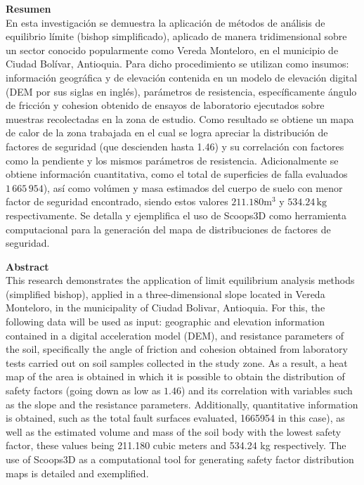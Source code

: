 \newpage
\textbf{\LARGE Resumen}\\
En esta investigaci\'on se demuestra la aplicaci\'on de m\'etodos de an\'alisis de equilibrio l\'imite (bishop simplificado), aplicado de manera tridimensional sobre un sector conocido popularmente como Vereda Monteloro, en el municipio de Ciudad Bol\'ivar, Antioquia. Para dicho procedimiento se utilizan como insumos: informaci\'on geogr\'afica y de elevaci\'on contenida en un modelo de elevaci\'on digital (DEM por sus siglas en ingl\'es), par\'ametros de resistencia, espec\'ificamente \'angulo de fricci\'on y cohesion obtenido de ensayos de laboratorio ejecutados sobre muestras recolectadas en la zona de estudio. Como resultado se obtiene un mapa de calor de la zona trabajada en el cual se logra apreciar la distribuci\'on de factores de seguridad (que descienden hasta 1.46) y su correlaci\'on con factores como la pendiente y los mismos par\'ametros de resistencia. Adicionalmente se obtiene informaci\'on cuantitativa, como el total de superficies de falla evaluados \(1\,665\,954\)), as\'i como  vol\'umen y masa estimados del cuerpo de suelo con menor factor de seguridad encontrado, siendo estos valores $211.180\text{m}^{3}$ y $534.24\,\text{kg}$ respectivamente.
Se detalla y ejemplifica el uso de Scoops3D como herramienta computacional para la generaci\'on del mapa de distribuciones de factores de seguridad. 



\newpage
\textbf{\LARGE Abstract}\\
This research demonstrates the application of limit equilibrium analysis methods (simplified bishop), applied in a three-dimensional slope located in Vereda Monteloro, in the municipality of Ciudad Bolivar, Antioquia. For this, the following data will be used as input: geographic and elevation information contained in a digital acceleration model (DEM), and resistance parameters of the soil, specifically the angle of friction and cohesion obtained from laboratory tests carried out on soil samples collected in the study zone. As a result, a heat map of the area is obtained in which it is possible to obtain the distribution of safety factors (going down as low as $1.46$) and its correlation with variables such as the slope and the resistance parameters. Additionally, quantitative information is obtained, such as the total fault surfaces evaluated, 1665954 in this case), as well as the estimated volume and mass of the soil body with the lowest safety factor, these values being 211.180 cubic meters and 534.24 kg respectively. The use of Scoops3D as a computational tool for generating safety factor distribution maps is detailed and exemplified.
